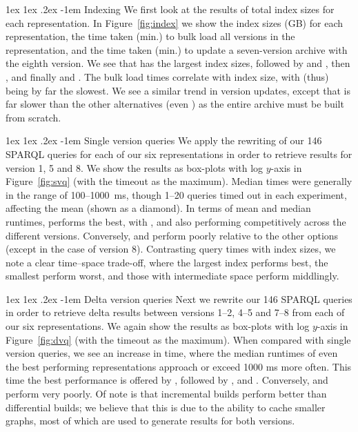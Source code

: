 \documentclass[a4paper]{llncs}
\makeatletter
\renewcommand\paragraph{\@startsection{paragraph}{4}{\z@}%
	{1ex \@plus1ex \@minus.2ex}%
	{-1em}%
	{\normalfont\normalsize\itshape}}
\makeatother
\begin{document}
\paragraph{Indexing} We first look at the results of total index sizes for each representation. In Figure~\ref{fig:index} we show the index sizes (GB) for each representation, the time taken (min.) to bulk load all versions in the representation, and the time taken (min.) to update a seven-version archive with the eighth version. We see that \ic has the largest index sizes, followed by \cbpd and \cbmd, then \tb, and finally \cbpi and \cbmi. The bulk load times correlate with index size, with \ic (thus) being by far the slowest. We see a similar trend in version updates, except that \cbmd is far slower than the other alternatives (even \ic) as the entire archive must be built from scratch.

\paragraph{Single version queries} We apply the rewriting of our 146 SPARQL queries for each of our six representations in order to retrieve results for version 1, 5 and 8. We show the results as box-plots with log $y$-axis in Figure~\ref{fig:svq} (with the timeout as the maximum). Median times were generally in the range of 100--1000~ms, though 1--20 queries timed out in each experiment, affecting the mean (shown as a diamond). In terms of mean and median runtimes, \ic performs the best, with \cbpd, \cbmd and \tb also performing competitively across the different versions. Conversely, \cbpi and \cbmi perform poorly relative to the other options (except \cbmi in the case of version 8). Contrasting query times with index sizes, we note a clear time--space trade-off, where the largest index performs best, the smallest perform worst, and those with intermediate space perform middlingly. 

\paragraph{Delta version queries} Next we rewrite our 146 SPARQL queries in order to retrieve delta results between versions 1--2, 4--5 and 7--8 from each of our six representations. We again show the results as box-plots with log $y$-axis in Figure~\ref{fig:dvq} (with the timeout as the maximum). When compared with single version queries, we see an increase in time, where the median runtimes of even the best performing representations approach or exceed 1000 ms more often. This time the best performance is offered by \tb, followed by \ic, \cbpi and \cbmi. Conversely,  \cbpd and \cbmd perform very poorly. Of note is that incremental builds perform better than differential builds; we believe that this is due to the ability to cache smaller graphs, most of which are used to generate results for both versions.
\end{document}
